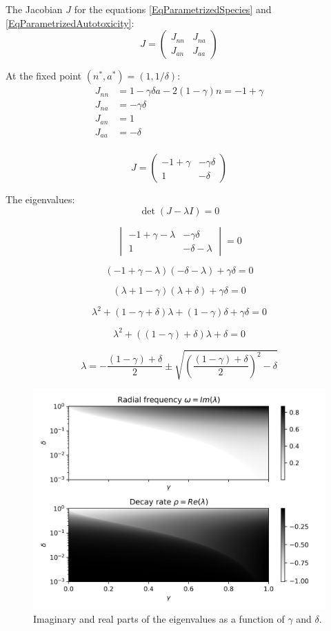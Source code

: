 \documentclass[11pt,a4paper,fleqn]{scrartcl}
\begin{document}
The Jacobian $J$ for the equations \ref{EqParametrizedSpecies} and \ref{EqParametrizedAutotoxicity}:
\[
J = 
\begin{pmatrix}
J_{nn} & J_{na} \\
J_{an} & J_{aa}
\end{pmatrix}
\]

At the fixed point $(n^*, a^*) = (1, 1/\delta)$:
\begin{align*}
J_{nn} &= 1 - \gamma \delta a - 2(1 - \gamma)n = -1 + \gamma \\
J_{na} &= -\gamma \delta \\
J_{an} &= 1\\
J_{aa}&= -\delta\\
\end{align*}

\[
J =
\begin{pmatrix}
-1 + \gamma & -\gamma \delta \\
1 & -\delta
\end{pmatrix}
\]

The eigenvalues:
\[
\det(J - \lambda I) = 0
\]

\[
\begin{vmatrix}
-1 + \gamma - \lambda & -\gamma \delta \\
1 & -\delta - \lambda
\end{vmatrix}
= 0
\]

\[
(-1 + \gamma - \lambda)(-\delta - \lambda) + \gamma \delta = 0
\]

\[
(\lambda + 1 - \gamma)(\lambda + \delta) + \gamma \delta = 0
\]

\[
\lambda^2 + (1 - \gamma + \delta)\lambda + (1 - \gamma)\delta + \gamma \delta = 0
\]

\[
\lambda^2 + \left( (1 - \gamma) + \delta \right)\lambda + \delta = 0
\]

\[
\lambda = -\frac{(1 - \gamma) + \delta}{2} 
\pm 
\sqrt{\left( \frac{(1 - \gamma) + \delta}{2} \right)^2 - \delta}
\]

\begin{figure}[H]
    \centering
    \includegraphics[width=\linewidth]{SingleSpecies/RadFreq.png}
    \caption{Imaginary and real parts of the eigenvalues as a function of $\gamma$ and $\delta$.}
\label{figRealandImaginaryPart}
\end{figure}
\end{document}
